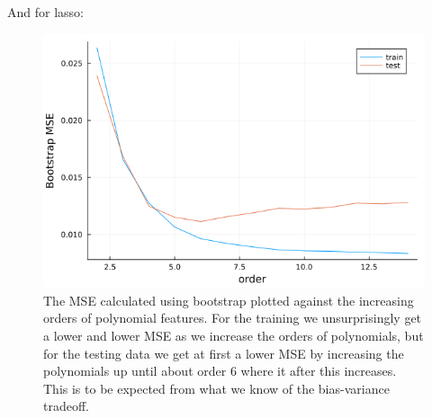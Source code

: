 \documentclass{article}
\begin{document}
And for lasso:
\begin{table}[htpb!]
\end{table}

\begin{figure}
    \includegraphics[scale=0.5]{bootstrapbiasvariance}
    \caption{The MSE calculated using bootstrap plotted against the increasing
        orders of polynomial features. For the training we unsurprisingly get a
        lower and lower MSE as we increase the orders of polynomials, but for the
        testing data we get at first a lower MSE by increasing the polynomials up
        until about order $6$ where it after this increases. This is to be expected
        from what we know of the bias-variance tradeoff.}
    \label{bootstrap-bias-var}
\end{figure}
\end{document}
